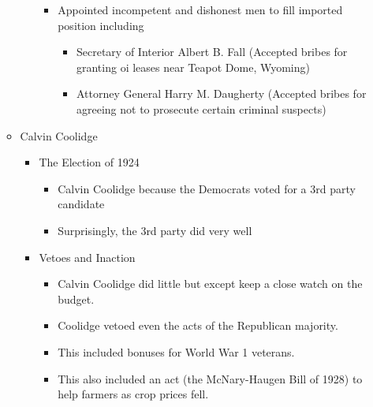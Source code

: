 \documentclass[12pt]{article} %
\begin{document}
\begin{enumerate}
\begin{itemize}
\begin{itemize}
\begin{itemize}
				\item Appointed incompetent and dishonest men to fill imported position including
				\begin{itemize}
					\item Secretary of Interior Albert B. Fall (Accepted bribes for granting oi leases near Teapot Dome, Wyoming)
					\item Attorney General Harry M. Daugherty (Accepted bribes for agreeing not to prosecute certain criminal suspects)
				\end{itemize}
			\end{itemize}
		\end{itemize}
		\item Calvin Coolidge
		\begin{itemize}
			\item The Election of 1924
			\begin{itemize}
				\item Calvin Coolidge because the Democrats voted for a 3rd party candidate
				\item Surprisingly, the 3rd party did very well
			\end{itemize}
			\item Vetoes and Inaction
			\begin{itemize}
				\item Calvin Coolidge did little but except keep a close watch on the budget.
				\item Coolidge vetoed even the acts of the Republican majority.
				\item This included bonuses for World War 1 veterans.
				\item This also included an act (the McNary-Haugen Bill of 1928) to help 
					farmers as crop prices fell.
			\end{itemize}
		\end{itemize}
	\end{itemize}
\end{enumerate}
\end{document}
